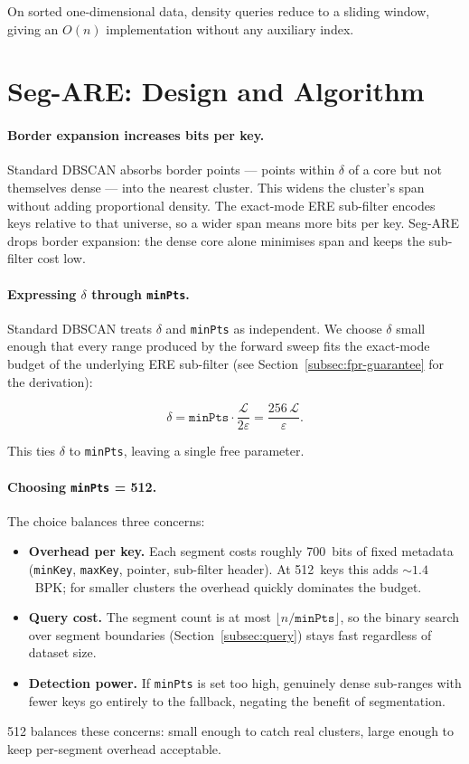 On sorted one-dimensional data, density queries reduce to a sliding window, giving an
$O(n)$ implementation without any auxiliary index.


\section{Seg-ARE: Design and Algorithm}
\label{sec:hybrid-scan}

\paragraph{Border expansion increases bits per key.}
Standard DBSCAN absorbs border points --- points within $\delta$ of a core but not
themselves dense --- into the nearest cluster.
This widens the cluster's span without adding proportional density.
The exact-mode ERE sub-filter encodes keys relative to that universe, so a wider span
means more bits per key.
Seg-ARE drops border expansion: the dense core alone minimises span and keeps the
sub-filter cost low.

\paragraph{Expressing $\delta$ through \texttt{minPts}.}
Standard DBSCAN treats $\delta$ and \texttt{minPts} as independent.
We choose $\delta$ small enough that every range produced by the forward sweep
fits the exact-mode budget of the underlying ERE sub-filter
(see Section~\ref{subsec:fpr-guarantee} for the derivation):

\begin{equation}
    \delta = \texttt{minPts} \cdot \frac{\mathcal{L}}{2\varepsilon} = \frac{256\,\mathcal{L}}{\varepsilon}.
    \label{eq:delta}
\end{equation}

This ties $\delta$ to \texttt{minPts}, leaving a single free parameter.

\paragraph{Choosing \texttt{minPts} = 512.}
The choice balances three concerns:
\begin{itemize}
    \item \textbf{Overhead per key.} Each segment costs roughly 700~bits of fixed metadata
    (\texttt{minKey}, \texttt{maxKey}, pointer, sub-filter header).
    At 512~keys this adds $\sim 1.4$~BPK; for smaller clusters the overhead quickly
    dominates the budget.
    \item \textbf{Query cost.} The segment count is at most $\lfloor n/\texttt{minPts} \rfloor$,
    so the binary search over segment boundaries (Section~\ref{subsec:query}) stays fast
    regardless of dataset size.
    \item \textbf{Detection power.} If \texttt{minPts} is set too high, genuinely dense
    sub-ranges with fewer keys go entirely to the fallback, negating the benefit of
    segmentation.
\end{itemize}
512 balances these concerns: small enough to catch real clusters, large enough to
keep per-segment overhead acceptable.

